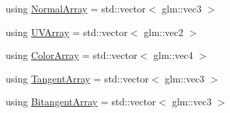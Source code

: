 \begin{DoxyCompactItemize}
using \hyperlink{class_rendering_object_a327c4d892de8d6138fb59afa6d078257}{Normal\+Array} = std\+::vector$<$ glm\+::vec3 $>$
\item 
using \hyperlink{class_rendering_object_a504ecd45ebe36dfa5b78c46d64d9904a}{U\+V\+Array} = std\+::vector$<$ glm\+::vec2 $>$
\item 
using \hyperlink{class_rendering_object_a8a12e1f9be788d99af6c089e1c600022}{Color\+Array} = std\+::vector$<$ glm\+::vec4 $>$
\item 
using \hyperlink{class_rendering_object_a45b53e911c2f0131aa10e89869d38944}{Tangent\+Array} = std\+::vector$<$ glm\+::vec3 $>$
\item 
using \hyperlink{class_rendering_object_a6c6bf305a5f0f9ce1006f374c753c856}{Bitangent\+Array} = std\+::vector$<$ glm\+::vec3 $>$
\end{DoxyCompactItemize}
